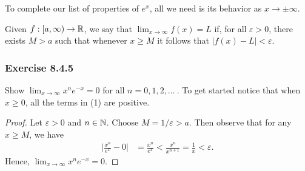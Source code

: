 To complete our list of properties of \( e^{x}  \), all we need is its behavior as \( x \to \pm \infty  \).

\begin{definition}{}{}
    Given \( f : [a,\infty )  \to \mathbb{R} \), we say that \( \lim_{ x \to \infty  }  f(x) = L  \) if, for all \( \varepsilon > 0  \), there exists \( M > a  \) such that whenever \( x \geq M  \) it follows that \( |  f(x) - L  | < \varepsilon  \).
\end{definition}

\subsubsection{Exercise 8.4.5} Show \( \lim_{ x \to \infty  }  x^{n} e^{-x} = 0  \) for all \( n = 0,1,2, \dots \ \). To get started notice that when \( x \geq 0   \), all the terms in (1) are positive.
\begin{proof}
    Let \( \varepsilon > 0  \) and \( n \in \mathbb{N}  \). Choose \( M = 1 / \varepsilon  > a   \). Then observe that for any \( x \geq M  \), we have
    \begin{align*}
        \Big| \frac{ x^{n} }{  e^{x} }  - 0  \Big| &= \frac{ x^{n}  }{  e^{x} }  
                                                   <  \frac{ x^{n}  }{  x^{n+1} } 
                                                   = \frac{ 1 }{ x } 
                                                   < \varepsilon.
    \end{align*}
    Hence, \( \lim_{ x \to \infty  }  x^{n} e^{-x} = 0. \)
\end{proof}

